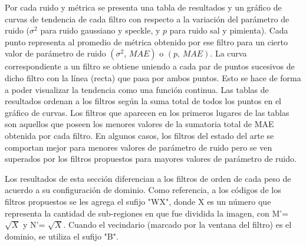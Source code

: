 Por cada ruido y métrica se presenta una tabla de resultados y un gráfico de curvas de tendencia de cada filtro con respecto a la variación del parámetro de ruido ($\sigma^2$ para ruido gaussiano y speckle, y $p$ para ruido sal y pimienta). Cada punto representa al promedio de métrica obtenido por ese filtro para un cierto valor de parámetro de ruido $(\sigma^2,\,MAE)$ o $(p,\,MAE)$. La curva correspondiente a un filtro se obtiene uniendo a cada par de puntos sucesivos de dicho filtro con la línea (recta) que pasa por ambos puntos. Esto se hace de forma  a poder visualizar la tendencia como una función continua. Las tablas de resultados ordenan a los filtros según la suma total de todos los puntos en el gráfico de curvas. Los filtros que aparecen en los primeros lugares de las tablas son aquellos que poseen los menores valores de la sumatoria total de MAE obtenida por cada filtro. En algunos casos, los filtros del estado del arte se comportan mejor para menores valores de parámetro de ruido pero se ven superados por los filtros propuestos para mayores valores de parámetro de ruido. 

 Los resultados de esta sección diferencian a los filtros de orden de cada peso de acuerdo a su configuración de dominio. Como referencia, a los códigos de los filtros propuestos se les agrega el sufijo "WX", donde X es un número que representa la cantidad de sub-regiones en que fue dividida la imagen, con M'= $\sqrt{X}$ y N'= $\sqrt{X}$. Cuando el vecindario (marcado por la ventana del filtro) es el dominio, se utiliza el sufijo "B".





\pgfplotstablegetcolsof{\ventanasmaegaussian}
\pgfplotstablegetrowsof{\ventanasmaegaussian}

\pgfplotstabletranspose[
colnames from=p,
input colnames to=p
]


